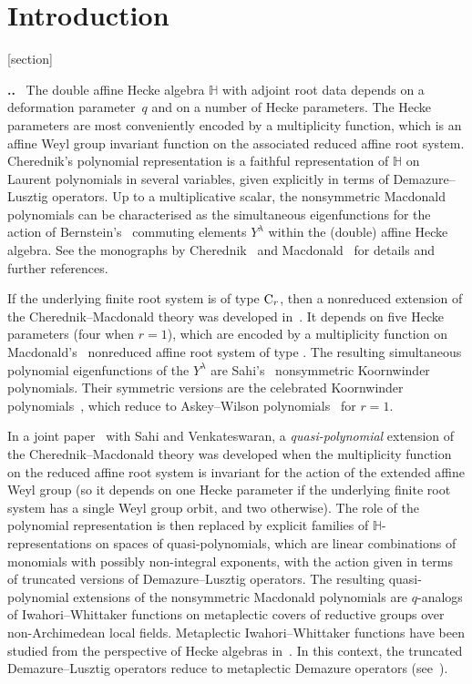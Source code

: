 \documentclass[pdftex]{sigma}
\numberwithin{equation}{section}
\begin{document}
{
\renewcommand{\theTheorem}{\Alph{Theorem}}

\section{Introduction}%

[section]      \renewcommand{\theparanum}{\thesection.\arabic{paranum}}      \newcommand{\mypar}{\vspace{10pt}\noindent{}\textbf{\theparanum.}\ }

\mypar
The double affine Hecke algebra $\mathbb{H}$ with adjoint root data depends on a deformation parameter~$q$ and on a number of Hecke parameters. The Hecke parameters are most conveniently encoded by a multiplicity function, which is an affine Weyl group invariant function on the associated reduced affine root system. Cherednik's polynomial representation is a faithful representation of $\mathbb{H}$ on Laurent polynomials in several variables, given explicitly in terms of Demazure--Lusztig operators. Up to a multiplicative scalar, the nonsymmetric Macdonald polynomials can be characterised as the simultaneous eigenfunctions for the action of Bernstein's~\cite{Lu} commuting elements $Y^\lambda$ within the (double) affine Hecke algebra. See the monographs by Cherednik~\cite{ChBook} and Macdonald~\cite{Ma} for details and further references.

If the underlying finite root system is of type ${\rm C}_r$, then a nonreduced extension of the Che\-red\-nik--Macdonald theory was developed in~\cite{No,Sa,St}. It depends on five Hecke parameters (four when $r=1$), which are encoded by a multiplicity function
on Macdonald's~\cite{MacAff} nonreduced affine root system of type .
The resulting simultaneous polynomial eigenfunctions of the $Y^\lambda$ are Sahi's~\cite{Sa} nonsymmetric Koornwinder polynomials.
Their symmetric versions are the celebrated Koornwinder polynomials~\cite{Ko}, which reduce to Askey--Wilson polynomials~\cite{AW} for $r=1$.

In a joint paper~\cite{SSV2} with Sahi and Venkateswaran, a {\it quasi-polynomial} extension of the Cherednik--Macdonald theory was developed when the multiplicity function on the reduced affine root system is invariant for the action of the extended affine Weyl group (so it depends on one Hecke parameter if the underlying finite root system has a single Weyl group orbit, and two otherwise).
The role of the polynomial representation is then replaced by explicit families of $\mathbb{H}$-representations on spaces of quasi-polynomials, which are linear combinations of monomials with possibly non-integral exponents, with the action given in terms of truncated versions of Demazure--Lusztig operators.
The resulting quasi-polynomial extensions of the nonsymmetric Macdonald polynomials are $q$-analogs
of Iwahori--Whittaker functions on metaplectic covers of reductive groups over non-Archimedean local fields. Metaplectic Iwahori--Whittaker functions have been studied from the perspective of Hecke algebras in~\cite{BBBF,CGP,PP,PP2,SSV2}.
In this context, the truncated Demazure--Lusztig operators reduce to metaplectic Demazure operators (see~\cite{SSV2}).

}
\end{document}
